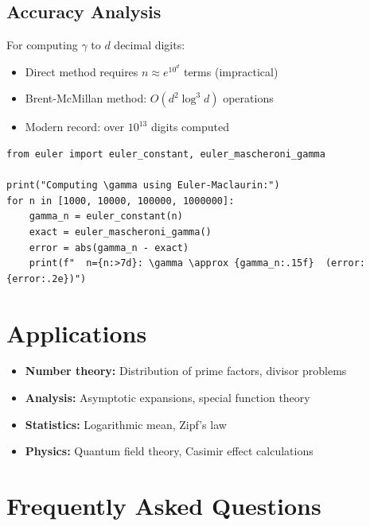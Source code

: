 \subsection{Accuracy Analysis}
For computing $\gamma$ to $d$ decimal digits:
\begin{itemize}
\item Direct method requires $n \approx e^{10^d}$ terms (impractical)
\item Brent-McMillan method: $O(d^2 \log^3 d)$ operations
\item Modern record: over $10^{13}$ digits computed
\end{itemize}

\begin{lstlisting}[caption={Computing gamma via Euler-Maclaurin}, label=lst:gamma_em]
from euler import euler_constant, euler_mascheroni_gamma

print("Computing \gamma using Euler-Maclaurin:")
for n in [1000, 10000, 100000, 1000000]:
    gamma_n = euler_constant(n)
    exact = euler_mascheroni_gamma()
    error = abs(gamma_n - exact)
    print(f"  n={n:>7d}: \gamma \approx {gamma_n:.15f}  (error: {error:.2e})")
\end{lstlisting}

\section{Applications}

\begin{itemize}
\item \textbf{Number theory:} Distribution of prime factors, divisor problems
\item \textbf{Analysis:} Asymptotic expansions, special function theory
\item \textbf{Statistics:} Logarithmic mean, Zipf's law
\item \textbf{Physics:} Quantum field theory, Casimir effect calculations
\end{itemize}

\section{Frequently Asked Questions}

